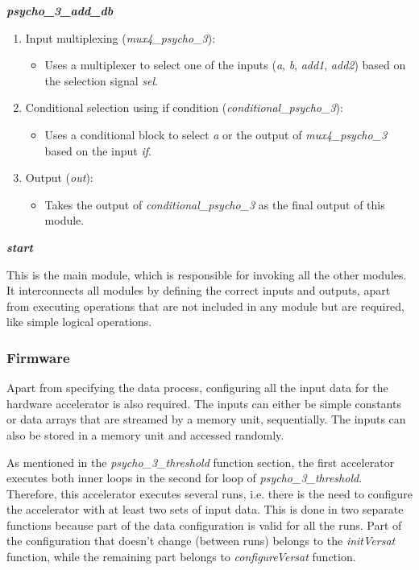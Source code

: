 \documentclass{article}
\begin{document}
\vspace{0.5cm}

\textbf{\textit{psycho\_3\_add\_db}}

\begin{enumerate}

\item Input multiplexing (\textit{mux4\_psycho\_3}):
\begin{itemize}
\item Uses a multiplexer to select one of the inputs (\textit{a}, \textit{b}, \textit{add1}, \textit{add2}) based on the selection signal \textit{sel}.
\end{itemize}

\item Conditional selection using if condition (\textit{conditional\_psycho\_3}):
\begin{itemize}
\item Uses a conditional block to select \textit{a} or the output of \textit{mux4\_psycho\_3} based on the input \textit{if}.
\end{itemize}

\item Output (\textit{out}):
\begin{itemize}
\item Takes the output of \textit{conditional\_psycho\_3} as the final output of this module.
\end{itemize}

\end{enumerate}

\vspace{0.5cm}

\textbf{\textit{start}}

This is the main module, which is responsible for invoking all the other modules. It interconnects all modules by defining the correct inputs and outputs, apart from executing operations that are not included in any module but are required, like simple logical operations.


\subsubsection{Firmware}
Apart from specifying the data process, configuring all the input data for the hardware accelerator is also required. The inputs can either be simple constants or data arrays that are streamed by a memory unit, sequentially. The inputs can also be stored in a memory unit and accessed randomly.

As mentioned in the \textit{psycho\_3\_threshold} function section, the first accelerator executes both inner loops in the second for loop of \textit{psycho\_3\_threshold}.
Therefore, this accelerator executes several runs, i.e. there is the need to configure the accelerator with at least two sets of input data.
This is done in two separate functions because part of the data configuration is valid for all the runs. Part of the configuration that doesn't change (between runs) belongs to the \textit{initVersat} function, while the remaining part belongs to \textit{configureVersat} function.
\end{document}
